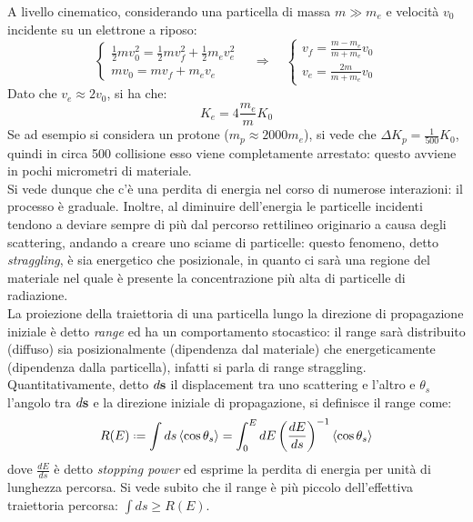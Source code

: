A livello cinematico, considerando una particella di massa $ m \gg m_e $ e velocità $ v_0 $ incidente su un elettrone a riposo:
\begin{equation*}
	\begin{cases}
		\frac{1}{2} m v_0^2 = \frac{1}{2} m v_f^2 + \frac{1}{2} m_e v_e^2 \\
		m v_0 = m v_f + m_e v_e
	\end{cases}
	\quad\Rightarrow\quad
	\begin{cases}
		v_f = \frac{m - m_e}{m + m_e} v_0 \\
		v_e = \frac{2m}{m + m_e} v_0
	\end{cases}
\end{equation*}
Dato che $ v_e \approx 2v_0 $, si ha che:
\begin{equation}
	K_e = 4 \frac{m_e}{m} K_0
	\label{eq:3.2}
\end{equation}
Se ad esempio si considera un protone ($ m_p \approx 2000 m_e $), si vede che $ \Delta K_p = \frac{1}{500} K_0 $, quindi in circa 500 collisione esso viene completamente arrestato: questo avviene in pochi micrometri di materiale.\\
Si vede dunque che c'è una perdita di energia nel corso di numerose interazioni: il processo è graduale. Inoltre, al diminuire dell'energia le particelle incidenti tendono a deviare sempre di più dal percorso rettilineo originario a causa degli scattering, andando a creare uno sciame di particelle: questo fenomeno, detto \textit{straggling}, è sia energetico che posizionale, in quanto ci sarà una regione del materiale nel quale è presente la concentrazione più alta di particelle di radiazione.\\
La proiezione della traiettoria di una particella lungo la direzione di propagazione iniziale è detto \textit{range} ed ha un comportamento stocastico: il range sarà distribuito (diffuso) sia posizionalmente (dipendenza dal materiale) che energeticamente (dipendenza dalla particella), infatti si parla di range straggling. Quantitativamente, detto $ d\mathbf{s} $ il displacement tra uno scattering e l'altro e $ \theta_s $ l'angolo tra $ d\mathbf{s} $ e la direzione iniziale di propagazione, si definisce il range come:
\begin{equation}
	R(E) \defeq \int ds \braket{\cos \theta_s} = \int_0^E dE \left( \frac{dE}{ds} \right)^{-1} \braket{\cos \theta_s}
	\label{eq:}
\end{equation}
dove $ \frac{dE}{ds} $ è detto \textit{stopping power} ed esprime la perdita di energia per unità di lunghezza percorsa. Si vede subito che il range è più piccolo dell'effettiva traiettoria percorsa: $ \int ds \ge R(E) $.

